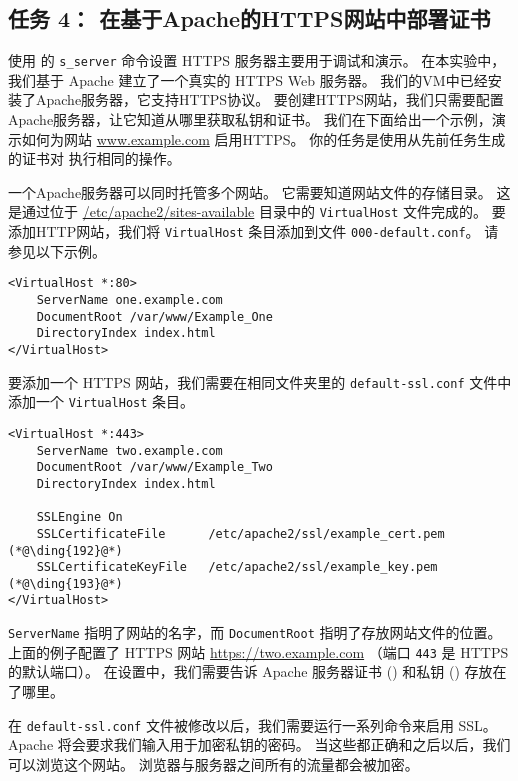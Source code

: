 \subsection{任务 4： 在基于Apache的HTTPS网站中部署证书}


使用 \openssl 的 \texttt{s\_server} 命令设置 HTTPS 服务器主要用于调试和演示。
在本实验中，我们基于 Apache 建立了一个真实的 HTTPS Web 服务器。
我们的VM中已经安装了Apache服务器，它支持HTTPS协议。
要创建HTTPS网站，我们只需要配置Apache服务器，让它知道从哪里获取私钥和证书。
我们在下面给出一个示例，演示如何为网站 \url{www.example.com} 启用HTTPS。
你的任务是使用从先前任务生成的证书对 {\pkiserver} 执行相同的操作。

一个Apache服务器可以同时托管多个网站。
它需要知道网站文件的存储目录。
这是通过位于 \url{/etc/apache2/sites-available} 目录中的 \texttt{VirtualHost} 文件完成的。
要添加HTTP网站，我们将 \texttt{VirtualHost} 条目添加到文件 \texttt{000-default.conf}。
请参见以下示例。

\begin{lstlisting}
<VirtualHost *:80>
    ServerName one.example.com
    DocumentRoot /var/www/Example_One
    DirectoryIndex index.html
</VirtualHost>
\end{lstlisting}

要添加一个 HTTPS 网站，我们需要在相同文件夹里的 \texttt{default-ssl.conf} 文件中添加一个 \texttt{VirtualHost} 条目。

\begin{lstlisting}
<VirtualHost *:443>
    ServerName two.example.com
    DocumentRoot /var/www/Example_Two
    DirectoryIndex index.html

    SSLEngine On
    SSLCertificateFile      /etc/apache2/ssl/example_cert.pem  (*@\ding{192}@*)
    SSLCertificateKeyFile   /etc/apache2/ssl/example_key.pem   (*@\ding{193}@*)
</VirtualHost>
\end{lstlisting}

\texttt{ServerName} 指明了网站的名字，而 \texttt{DocumentRoot} 指明了存放网站文件的位置。
上面的例子配置了 HTTPS 网站 \url{https://two.example.com}  （端口 \texttt{443}
是 HTTPS 的默认端口）。
在设置中，我们需要告诉 Apache 服务器证书 () 和私钥 () 存放在了哪里。


在 \texttt{default-ssl.conf} 文件被修改以后，我们需要运行一系列命令来启用 SSL。
Apache 将会要求我们输入用于加密私钥的密码。
当这些都正确和之后以后，我们可以浏览这个网站。
浏览器与服务器之间所有的流量都会被加密。

